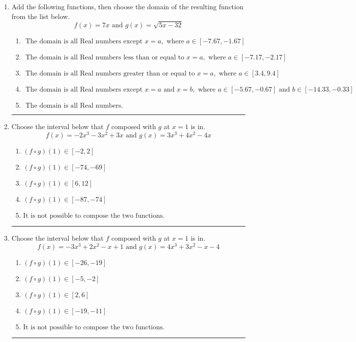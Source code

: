 \documentclass[14pt]{extbook}
\newcommand{\litem}[1]{\item#1\hspace*{-1cm}\rule{\textwidth}{0.4pt}}
\begin{document}
\begin{enumerate}
{\begin{enumerate}[label=\Alph*.]
\end{enumerate} }
\litem{
Add the following functions, then choose the domain of the resulting function from the list below.\[ f(x) = 7x \text{ and } g(x) = \sqrt{5x-32}  \]\begin{enumerate}[label=\Alph*.]
\item \( \text{ The domain is all Real numbers except } x = a, \text{ where } a \in [-7.67, -1.67] \)
\item \( \text{ The domain is all Real numbers less than or equal to } x = a, \text{ where } a \in [-7.17, -2.17] \)
\item \( \text{ The domain is all Real numbers greater than or equal to } x = a, \text{ where } a \in [3.4, 9.4] \)
\item \( \text{ The domain is all Real numbers except } x = a \text{ and } x = b, \text{ where } a \in [-5.67, -0.67] \text{ and } b \in [-14.33, -0.33] \)
\item \( \text{ The domain is all Real numbers. } \)

\end{enumerate} }
\litem{
Choose the interval below that $f$ composed with $g$ at $x=1$ is in.\[ f(x) = -2x^{3} -3 x^{2} +3 x \text{ and } g(x) = 3x^{3} +4 x^{2} -4 x \]\begin{enumerate}[label=\Alph*.]
\item \( (f \circ g)(1) \in [-2, 2] \)
\item \( (f \circ g)(1) \in [-74, -69] \)
\item \( (f \circ g)(1) \in [6, 12] \)
\item \( (f \circ g)(1) \in [-87, -74] \)
\item \( \text{It is not possible to compose the two functions.} \)

\end{enumerate} }
\litem{
Choose the interval below that $f$ composed with $g$ at $x=1$ is in.\[ f(x) = -3x^{3} +2 x^{2} -x + 1 \text{ and } g(x) = 4x^{3} +3 x^{2} -x -4 \]\begin{enumerate}[label=\Alph*.]
\item \( (f \circ g)(1) \in [-26, -19] \)
\item \( (f \circ g)(1) \in [-5, -2] \)
\item \( (f \circ g)(1) \in [2, 6] \)
\item \( (f \circ g)(1) \in [-19, -11] \)
\item \( \text{It is not possible to compose the two functions.} \)


\end{enumerate}}
\end{enumerate}
\end{document}
